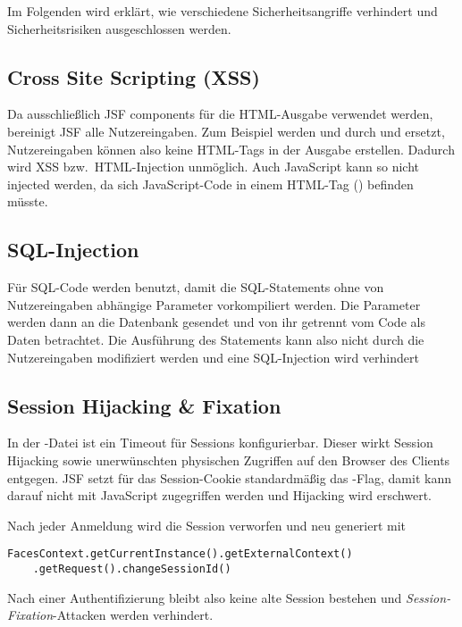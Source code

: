 
Im Folgenden wird erklärt, wie verschiedene Sicherheitsangriffe verhindert und Sicherheitsrisiken ausgeschlossen werden.

\subsection{Cross Site Scripting (XSS)}\label{subsec:xss}
Da ausschließlich JSF components für die HTML-Ausgabe verwendet werden, bereinigt JSF alle Nutzereingaben.
Zum Beispiel werden  und  durch  und  ersetzt, Nutzereingaben können also keine HTML-Tags in der Ausgabe erstellen.
Dadurch wird XSS bzw.\ HTML-Injection unmöglich.
Auch JavaScript kann so nicht injected werden, da sich JavaScript-Code in einem HTML-Tag () befinden müsste.

\subsection{SQL-Injection}\label{subsec:sql-injection}
Für SQL-Code werden  benutzt, damit die SQL-Statements ohne von Nutzereingaben abhängige Parameter vorkompiliert werden.
Die Parameter werden dann an die Datenbank gesendet und von ihr getrennt vom Code als Daten betrachtet.
Die Ausführung des Statements kann also nicht durch die Nutzereingaben modifiziert werden und eine SQL-Injection wird verhindert

\subsection{Session Hijacking \& Fixation}\label{subsec:session-hijacking}
In der -Datei ist ein Timeout für Sessions konfigurierbar.
Dieser wirkt Session Hijacking sowie unerwünschten physischen Zugriffen auf den Browser des Clients entgegen.
JSF setzt für das Session-Cookie standardmäßig das -Flag, damit kann darauf nicht mit JavaScript zugegriffen werden und Hijacking wird erschwert.

Nach jeder Anmeldung wird die Session verworfen und neu generiert mit
{\small
\begin{lstlisting}
FacesContext.getCurrentInstance().getExternalContext()
    .getRequest().changeSessionId()
\end{lstlisting}
}
Nach einer Authentifizierung bleibt also keine alte Session bestehen und \emph{Session-Fixation}-Attacken werden verhindert.


